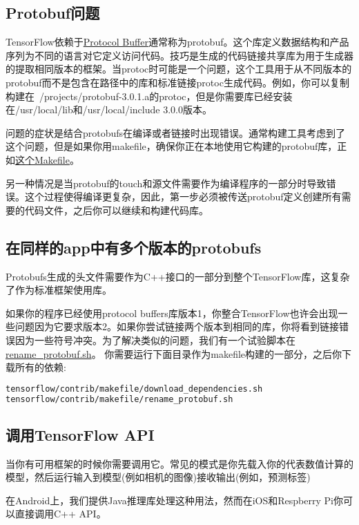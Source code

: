 \subsection{Protobuf问题}
TensorFlow依赖于\href{https://developers.google.com/protocol-buffers/}{Protocol Buffer}通常称为protobuf。这个库定义数据结构和产品序列为不同的语言对它定义访问代码。技巧是生成的代码链接共享库为用于生成器的提取相同版本的框架。当protoc时可能是一个问题，这个工具用于从不同版本的protobuf而不是包含在路径中的库和标准链接protoc生成代码。例如，你可以复制构建在~/projects/protobuf-3.0.1.a的protoc，但是你需要库已经安装在/usr/local/lib和/usr/local/include 3.0.0版本。

问题的症状是结合protobufs在编译或者链接时出现错误。通常构建工具考虑到了这个问题，但是如果你用makefile，确保你正在本地使用它构建的protobuf库，正如\href{https://github.com/tensorflow/tensorflow/blob/master/tensorflow/contrib/makefile/Makefile#L18}{这个Makefile}。

另一种情况是当protobuf的touch和源文件需要作为编译程序的一部分时导致错误。这个过程使得编译更复杂，因此，第一步必须被传送protobuf定义创建所有需要的代码文件，之后你可以继续和构建代码库。

\subsection{在同样的app中有多个版本的protobufs}
Protobufs生成的头文件需要作为C++接口的一部分到整个TensorFlow库，这复杂了作为标准框架使用库。

如果你的程序已经使用protocol buffers库版本1，你整合TensorFlow也许会出现一些问题因为它要求版本2。如果你尝试链接两个版本到相同的库，你将看到链接错误因为一些符号冲突。为了解决类似的问题，我们有一个试验脚本在\href{https://github.com/tensorflow/tensorflow/blob/master/tensorflow/contrib/makefile/rename_protobuf.sh}{rename\_protobuf.sh}。
你需要运行下面目录作为makefile构建的一部分，之后你下载所有的依赖:
\begin{lstlisting}[language=Bash]
tensorflow/contrib/makefile/download_dependencies.sh
tensorflow/contrib/makefile/rename_protobuf.sh 
\end{lstlisting}
\subsection{调用TensorFlow API}
当你有可用框架的时候你需要调用它。常见的模式是你先载入你的代表数值计算的模型，然后运行输入到模型(例如相机的图像)接收输出(例如，预测标签)

在Android上，我们提供Java推理库处理这种用法，然而在iOS和Respberry Pi你可以直接调用C++ API。
